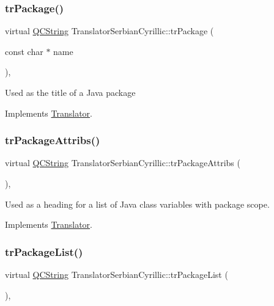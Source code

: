 \subsubsection{\texorpdfstring{trPackage()}{trPackage()}}
{\footnotesize\ttfamily virtual \mbox{\hyperlink{class_q_c_string}{Q\+C\+String}} Translator\+Serbian\+Cyrillic\+::tr\+Package (\begin{DoxyParamCaption}\item[{const char $\ast$}]{name }\end{DoxyParamCaption})\hspace{0.3cm}{\ttfamily [inline]}, {\ttfamily [virtual]}}

Used as the title of a Java package 

Implements \mbox{\hyperlink{class_translator}{Translator}}.

\mbox{\label{class_translator_serbian_cyrillic_acb41c128e86a14c89eaec67d289f98d6}} 
\subsubsection{\texorpdfstring{trPackageAttribs()}{trPackageAttribs()}}
{\footnotesize\ttfamily virtual \mbox{\hyperlink{class_q_c_string}{Q\+C\+String}} Translator\+Serbian\+Cyrillic\+::tr\+Package\+Attribs (\begin{DoxyParamCaption}{ }\end{DoxyParamCaption})\hspace{0.3cm}{\ttfamily [inline]}, {\ttfamily [virtual]}}

Used as a heading for a list of Java class variables with package scope. 

Implements \mbox{\hyperlink{class_translator}{Translator}}.

\mbox{\label{class_translator_serbian_cyrillic_a53c68048671e1ca513b441a7ee226021}} 
\subsubsection{\texorpdfstring{trPackageList()}{trPackageList()}}
{\footnotesize\ttfamily virtual \mbox{\hyperlink{class_q_c_string}{Q\+C\+String}} Translator\+Serbian\+Cyrillic\+::tr\+Package\+List (\begin{DoxyParamCaption}{ }\end{DoxyParamCaption})\hspace{0.3cm}{\ttfamily [inline]}, {\ttfamily [virtual]}}

